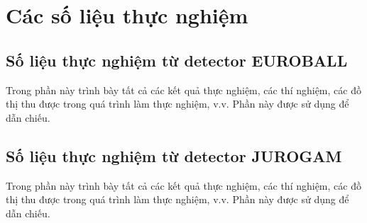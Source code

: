 \chapter{Các số liệu thực nghiệm}
\label{phuluc:solieuthucnghiem}

\section{Số liệu thực nghiệm từ detector EUROBALL} 
Trong phần này trình bày tất cả các kết quả thực nghiệm, các thí nghiệm, các đồ thị thu được trong quá trình làm thực nghiệm, v.v. Phần này được sử dụng để dẫn chiếu.

\section{Số liệu thực nghiệm từ detector JUROGAM}
Trong phần này trình bày tất cả các kết quả thực nghiệm, các thí nghiệm, các đồ thị thu được trong quá trình làm thực nghiệm, v.v. Phần này được sử dụng để dẫn chiếu.

